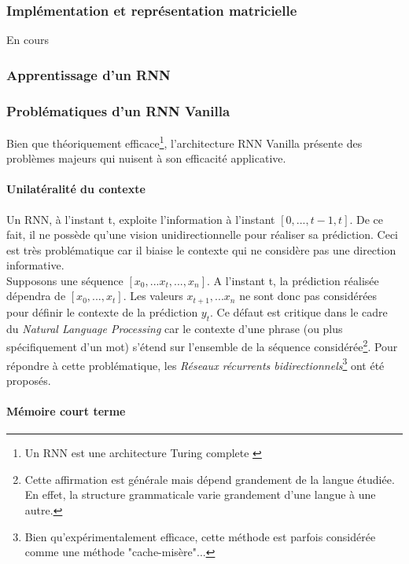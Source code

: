 \subsubsection{Implémentation et représentation matricielle}
En cours
\subsubsection{Apprentissage d'un RNN}

\subsubsection{Problématiques d'un RNN Vanilla}

\noindent Bien que théoriquement efficace\footnote{Un RNN est une architecture Turing complete \cite{rnn_turing}}, l'architecture RNN Vanilla présente des problèmes majeurs qui nuisent à son efficacité applicative.

\paragraph{Unilatéralité du contexte}

\noindent Un RNN, à l'instant t, exploite l'information à l'instant $[0,...,t-1,t]$. De ce fait, il ne possède qu'une vision unidirectionnelle pour réaliser sa prédiction. Ceci est très problématique car il biaise le contexte qui ne considère pas une direction informative.\\

\noindent Supposons une séquence $[x_0,...x_t,...,x_n]$. A l'instant t, la prédiction réalisée dépendra de $[x_0,...,x_t]$. Les valeurs $x_{t+1},...x_n$ ne sont donc pas considérées pour définir le contexte de la prédiction $y_t$. Ce défaut est critique dans le cadre du \textit{Natural Language Processing} car le contexte d'une phrase (ou plus spécifiquement d'un mot) s'étend sur l'ensemble de la séquence considérée\footnote{Cette affirmation est générale mais dépend grandement de la langue étudiée. En effet, la structure grammaticale varie grandement d'une langue à une autre.}. Pour répondre à cette problématique, les \textit{Réseaux récurrents bidirectionnels}\footnote{Bien qu'expérimentalement efficace, cette méthode est parfois considérée comme une méthode "cache-misère"...} ont été proposés.

\paragraph{Mémoire court terme}

